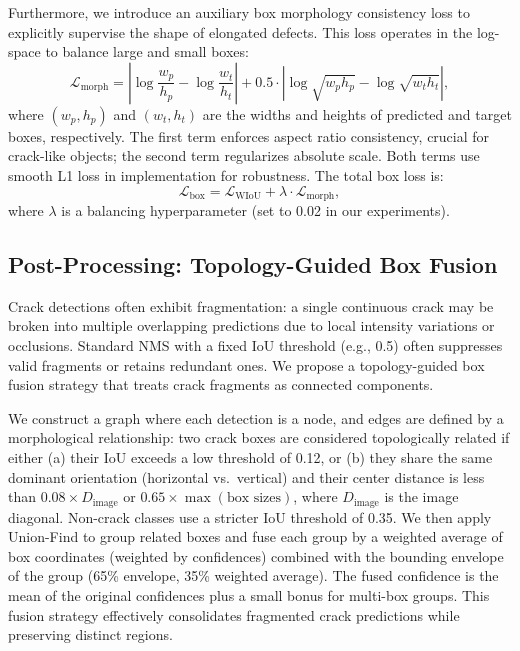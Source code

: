 \documentclass{ieeeaccess}
\begin{document}
{Furthermore, we introduce an auxiliary box morphology consistency loss to explicitly supervise the shape of elongated defects. This loss operates in the log-space to balance large and small boxes:
\begin{equation}
\mathcal{L}_{\text{morph}} = \left| \log\frac{w_p}{h_p} - \log\frac{w_t}{h_t} \right| + 0.5 \cdot \left| \log\sqrt{w_p h_p} - \log\sqrt{w_t h_t} \right|,
\end{equation}
where $(w_p, h_p)$ and $(w_t, h_t)$ are the widths and heights of predicted and target boxes, respectively. The first term enforces aspect ratio consistency, crucial for crack-like objects; the second term regularizes absolute scale. Both terms use smooth L1 loss in implementation for robustness. The total box loss is:
\begin{equation}
\mathcal{L}_{\text{box}} = \mathcal{L}_{\text{WIoU}} + \lambda \cdot \mathcal{L}_{\text{morph}},
\end{equation}
where $\lambda$ is a balancing hyperparameter (set to 0.02 in our experiments).

\subsection{Post-Processing: Topology-Guided Box Fusion}

Crack detections often exhibit fragmentation: a single continuous crack may be broken into multiple overlapping predictions due to local intensity variations or occlusions. Standard NMS with a fixed IoU threshold (e.g., 0.5) often suppresses valid fragments or retains redundant ones. We propose a topology-guided box fusion strategy that treats crack fragments as connected components.

We construct a graph where each detection is a node, and edges are defined by a morphological relationship: two crack boxes are considered topologically related if either (a) their IoU exceeds a low threshold of 0.12, or (b) they share the same dominant orientation (horizontal vs.\ vertical) and their center distance is less than $0.08 \times D_{\text{image}}$ or $0.65 \times \max(\text{box sizes})$, where $D_{\text{image}}$ is the image diagonal. Non-crack classes use a stricter IoU threshold of 0.35. We then apply Union-Find to group related boxes and fuse each group by a weighted average of box coordinates (weighted by confidences) combined with the bounding envelope of the group (65\% envelope, 35\% weighted average). The fused confidence is the mean of the original confidences plus a small bonus for multi-box groups. This fusion strategy effectively consolidates fragmented crack predictions while preserving distinct regions.

}
\end{document}
